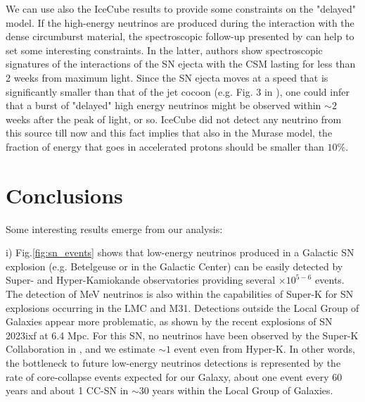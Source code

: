 \documentclass[twocolumn]{aastex631}
\begin{document}
{We can use also the IceCube results to provide some constraints on the \cite{Murase2011} "delayed" model. If the high-energy neutrinos are produced during the interaction with the dense circumburst material, the spectroscopic follow-up presented by \citep{Yamanaka2023} can help to set some interesting constraints. In the latter, authors show spectroscopic signatures of the interactions of the SN ejecta with the CSM lasting for less than 2 weeks from maximum light. Since the SN ejecta moves at a speed that is significantly smaller than that of the jet cocoon (e.g. Fig. 3 in \cite{Izzo2019}), one could infer that a burst of "delayed" high energy neutrinos might be observed within $\sim 2$ weeks after the peak of light, or so. IceCube did not detect any neutrino from this source till now \citep{IceCubeSN2023} and this fact implies that also in the Murase model, the fraction of energy that goes in accelerated protons should be smaller than $10\%$.
\bigskip

\section{Conclusions} 
\bigskip

 Some interesting results emerge from our analysis:
\bigskip

i) Fig.\ref{fig:sn_events} shows that low-energy neutrinos produced in a Galactic SN explosion (e.g. Betelgeuse or in the Galactic Center) can be easily detected by Super- and Hyper-Kamiokande observatories providing several $\times 10^{5-6}$ events. The detection of MeV neutrinos is also within the capabilities of Super-K for SN explosions occurring in the LMC and M31. Detections outside the Local Group of Galaxies appear more problematic, as shown by the recent explosions of SN 2023ixf at 6.4 Mpc. For this SN, no neutrinos have been observed by the Super-K Collaboration in \cite{atel_sk}, and we estimate $\sim 1$ event even from Hyper-K. In other words, the bottleneck to future low-energy neutrinos detections is represented by the rate of core-collapse events expected for our Galaxy, about one event every 60 years \citep{Cappellaro2015, Rozwadowska2021} and about 1 CC-SN in $\sim 30$ years within the Local Group of Galaxies. 

}
\end{document}
